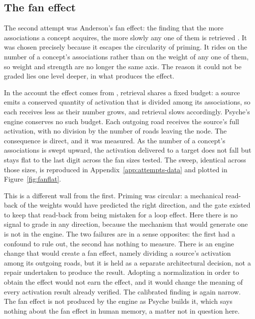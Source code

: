 \documentclass[11pt]{article}
\begin{document}
\subsection{The fan effect}

The second attempt was Anderson's fan effect: the finding that the more associations a
concept acquires, the more slowly any one of them is retrieved
\citep{anderson1974retrieval, andersonreder1999fan}. It was chosen precisely because it
escapes the circularity of priming. It rides on the number of a concept's associations
rather than on the weight of any one of them, so weight and strength are no longer the same
axis. The reason it could not be graded lies one level deeper, in what produces the effect.

In the account the effect comes from \citep{anderson1998atomic}, retrieval shares a fixed
budget: a source emits a conserved quantity of activation that is divided among its
associations, so each receives less as their number grows, and retrieval slows accordingly.
Psyche's engine conserves no such budget. Each outgoing road receives the source's full
activation, with no division by the number of roads leaving the node. The consequence is
direct, and it was measured. As the number of a concept's associations is swept upward, the
activation delivered to a target does not fall but stays flat to the last digit across the
fan sizes tested. The sweep, identical across those sizes, is reproduced in
Appendix~\ref{app:attempts-data} and plotted in Figure~\ref{fig:fanflat}.

This is a different wall from the first. Priming was circular: a mechanical read-back of the
weights would have predicted the right direction, and the gate existed to keep that
read-back from being mistaken for a loop effect. Here there is no signal to grade in any
direction, because the mechanism that would generate one is not in the engine. The two
failures are in a sense opposites: the first had a confound to rule out, the second has
nothing to measure. There is an engine change that would create a fan effect, namely
dividing a source's activation among its outgoing roads, but it is held as a separate
architectural decision, not a repair undertaken to produce the result. Adopting a
normalization in order to obtain the effect would not earn the effect, and it would change
the meaning of every activation result already verified. The calibrated finding is again
narrow. The fan effect is not produced by the engine as Psyche builds it, which says
nothing about the fan effect in human memory, a matter not in question here.
\end{document}
